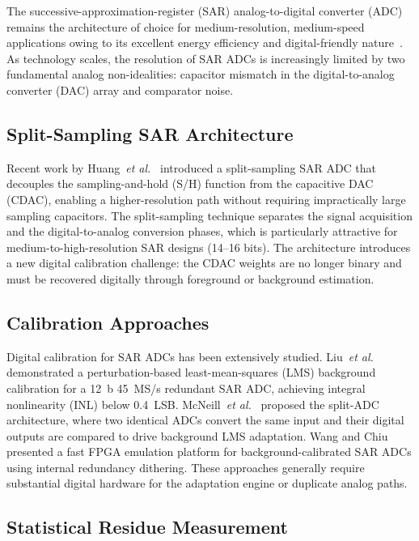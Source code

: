 \documentclass[journal]{IEEEtran}
\begin{document}
The successive-approximation-register (SAR) analog-to-digital converter (ADC)
remains the architecture of choice for medium-resolution, medium-speed
applications owing to its excellent energy efficiency and digital-friendly
nature~\cite{murmann_adc_survey}. As technology scales, the resolution of SAR ADCs is
increasingly limited by two fundamental analog non-idealities: capacitor
mismatch in the digital-to-analog converter (DAC) array and comparator noise.

\subsection{Split-Sampling SAR Architecture}

Recent work by Huang~\textit{et al.}~\cite{huang_jssc_2025} introduced a
split-sampling SAR ADC that decouples the sampling-and-hold (S/H) function
from the capacitive DAC (CDAC), enabling a higher-resolution path without
requiring impractically large sampling capacitors. The split-sampling technique
separates the signal acquisition and the digital-to-analog conversion phases,
which is particularly attractive for medium-to-high-resolution SAR designs
(14--16 bits). The architecture introduces a new digital calibration challenge:
the CDAC weights are no longer binary and must be recovered digitally through
foreground or background estimation.

\subsection{Calibration Approaches}

Digital calibration for SAR ADCs has been extensively studied. Liu~\textit{et
al.}~\cite{liu_jssc_2011} demonstrated a perturbation-based least-mean-squares
(LMS) background calibration for a 12~b 45~MS/s redundant SAR ADC, achieving
integral nonlinearity (INL) below 0.4~LSB. McNeill~\textit{et al.}~\cite{
mcneill_jssc_2005} proposed the split-ADC architecture, where two identical
ADCs convert the same input and their digital outputs are compared to drive
background LMS adaptation. Wang and Chiu~\cite{wang_tcasii_2014} presented a
fast FPGA emulation platform for background-calibrated SAR ADCs using internal
redundancy dithering. These approaches generally require substantial digital
hardware for the adaptation engine or duplicate analog paths.

\subsection{Statistical Residue Measurement}
\end{document}
